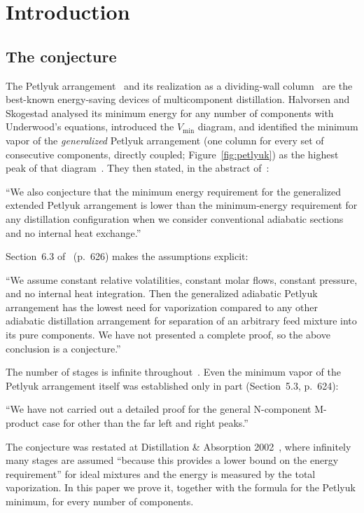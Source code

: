 \documentclass[11pt,a4paper]{report}
\begin{document}
\section{Introduction}\label{sec:intro}

\subsection{The conjecture}

The Petlyuk arrangement~\autocite{Petlyuk1965} and its realization as a dividing-wall column~\autocite{Kaibel1987}
are the best-known energy-saving devices of multicomponent distillation. Halvorsen and Skogestad analysed its minimum
energy for any number of components with Underwood's equations, introduced the \(V_{\min}\) diagram, and identified the
minimum vapor of the \emph{generalized} Petlyuk arrangement (one column for every set of consecutive components,
directly coupled; Figure~\ref{fig:petlyuk}) as the highest peak of that diagram~\autocite{HS1,HS2,HS3,HalvorsenThesis}. They then stated, in
the abstract of~\autocite{HS3}:
\begin{openquote}
``We also conjecture that the minimum energy requirement for the generalized extended Petlyuk arrangement is lower than
the minimum-energy requirement for any distillation configuration when we consider conventional adiabatic sections and
no internal heat exchange.''
\end{openquote}
Section~6.3 of~\autocite{HS3} (p.~626) makes the assumptions explicit:
\begin{openquote}
``We assume constant relative volatilities, constant molar flows, constant pressure, and no internal heat integration.
Then the generalized adiabatic Petlyuk arrangement has the lowest need for vaporization compared to any other adiabatic
distillation arrangement for separation of an arbitrary feed mixture into its pure components. We have not presented a
complete proof, so the above conclusion is a conjecture.''
\end{openquote}
The number of stages is infinite throughout~\autocite{HS3}. Even the minimum vapor of the Petlyuk arrangement itself was
established only in part (Section~5.3, p.~624):
\begin{openquote}
``We have not carried out a detailed proof for the general N-component M-product case for other than the far left and
right peaks.''
\end{openquote}
The conjecture was restated at Distillation \& Absorption 2002~\autocite{HS02}, where infinitely many stages are
assumed ``because this provides a lower bound on the energy requirement'' for ideal mixtures and the energy is measured
by the total vaporization. In this paper we prove it, together with the formula for the Petlyuk minimum, for every
number of components.
\end{document}
